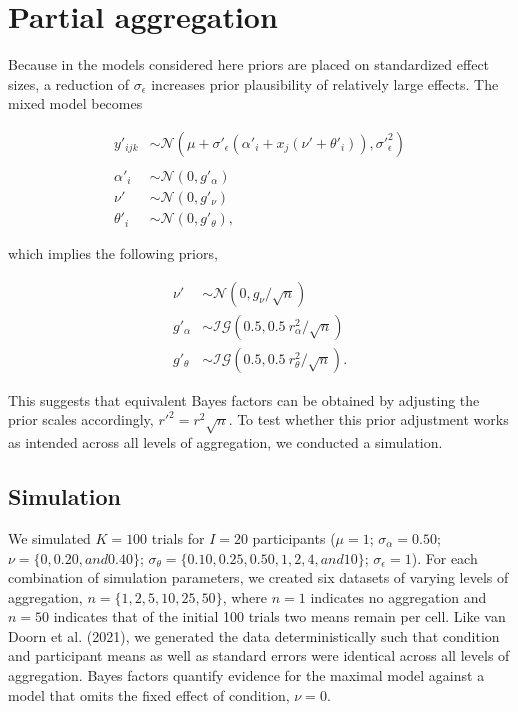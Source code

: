 \documentclass[
  man,floatsintext,draftall]{apa6}
\begin{document}
\hypertarget{partial-aggregation}{%
\section{Partial aggregation}\label{partial-aggregation}}

Because in the models considered here priors are placed on standardized effect sizes, a reduction of \(\sigma_\epsilon\) increases prior plausibility of relatively large effects.
The mixed model becomes

\[
\begin{aligned}
y\prime_{ijk} & \sim \mathcal{N}(\mu + \sigma\prime_\epsilon (\alpha\prime_i + x_j (\nu\prime + \theta\prime_i)), \sigma\prime_\epsilon^{2}) \\ & \\
\alpha\prime_i & \sim \mathcal{N}(0, g\prime_\alpha) \\
\nu\prime & \sim \mathcal{N}(0, g\prime_\nu) \\
\theta\prime_i & \sim \mathcal{N}(0, g\prime_\theta),
\end{aligned}
\]

which implies the following priors,

\[
\begin{aligned}
\nu\prime & \sim \mathcal{N}(0, g_{\nu}/\sqrt{n}) \\
g\prime_\alpha & \sim \mathcal{IG}(0.5, 0.5~r^2_{\alpha}/\sqrt{n}) \\
g\prime_\theta & \sim\mathcal{IG}(0.5, 0.5~r^2_{\theta}/\sqrt{n}).
\end{aligned}
\]

This suggests that equivalent Bayes factors can be obtained by adjusting the prior scales accordingly, \(r\prime^2 = r^2 \sqrt{n}\).
To test whether this prior adjustment works as intended across all levels of aggregation, we conducted a simulation.

\hypertarget{simulation}{%
\subsection{Simulation}\label{simulation}}

We simulated \(K = 100\) trials for \(I = 20\) participants (\(\mu = 1\); \(\sigma_\alpha = 0.50\); \(\nu = \{0, 0.20, and 0.40\}\); \(\sigma_\theta = \{0.10, 0.25, 0.50, 1, 2, 4, and 10\}\); \(\sigma_\epsilon = 1\)).
For each combination of simulation parameters, we created six datasets of varying levels of aggregation, \(n = \{1, 2, 5, 10, 25, 50\}\), where \(n = 1\) indicates no aggregation and \(n = 50\) indicates that of the initial 100 trials two means remain per cell.
Like van Doorn et al. (2021), we generated the data deterministically such that condition and participant means as well as standard errors were identical across all levels of aggregation.
Bayes factors quantify evidence for the maximal model against a model that omits the fixed effect of condition, \(\nu = 0\).
\end{document}
